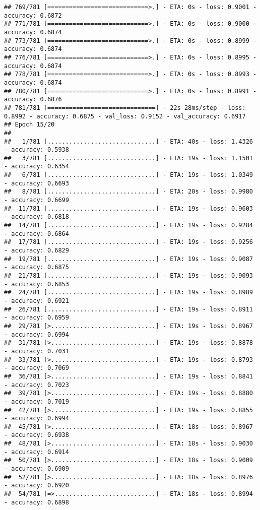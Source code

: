 \documentclass[
]{article}
\begin{document}
\begin{verbatim}
## 769/781 [============================>.] - ETA: 0s - loss: 0.9001 - accuracy: 0.6872
## 771/781 [============================>.] - ETA: 0s - loss: 0.9000 - accuracy: 0.6874
## 773/781 [============================>.] - ETA: 0s - loss: 0.8999 - accuracy: 0.6874
## 776/781 [============================>.] - ETA: 0s - loss: 0.8995 - accuracy: 0.6874
## 778/781 [============================>.] - ETA: 0s - loss: 0.8993 - accuracy: 0.6874
## 780/781 [============================>.] - ETA: 0s - loss: 0.8991 - accuracy: 0.6876
## 781/781 [==============================] - 22s 28ms/step - loss: 0.8992 - accuracy: 0.6875 - val_loss: 0.9152 - val_accuracy: 0.6917
## Epoch 15/20
## 
##   1/781 [..............................] - ETA: 40s - loss: 1.4326 - accuracy: 0.5938
##   3/781 [..............................] - ETA: 19s - loss: 1.1501 - accuracy: 0.6354
##   6/781 [..............................] - ETA: 19s - loss: 1.0349 - accuracy: 0.6693
##   8/781 [..............................] - ETA: 20s - loss: 0.9980 - accuracy: 0.6699
##  11/781 [..............................] - ETA: 19s - loss: 0.9603 - accuracy: 0.6818
##  14/781 [..............................] - ETA: 19s - loss: 0.9284 - accuracy: 0.6864
##  17/781 [..............................] - ETA: 19s - loss: 0.9256 - accuracy: 0.6829
##  19/781 [..............................] - ETA: 19s - loss: 0.9087 - accuracy: 0.6875
##  21/781 [..............................] - ETA: 19s - loss: 0.9093 - accuracy: 0.6853
##  24/781 [..............................] - ETA: 19s - loss: 0.8989 - accuracy: 0.6921
##  26/781 [..............................] - ETA: 19s - loss: 0.8911 - accuracy: 0.6959
##  29/781 [>.............................] - ETA: 19s - loss: 0.8967 - accuracy: 0.6994
##  31/781 [>.............................] - ETA: 19s - loss: 0.8878 - accuracy: 0.7031
##  33/781 [>.............................] - ETA: 19s - loss: 0.8793 - accuracy: 0.7069
##  36/781 [>.............................] - ETA: 19s - loss: 0.8841 - accuracy: 0.7023
##  39/781 [>.............................] - ETA: 19s - loss: 0.8880 - accuracy: 0.7019
##  42/781 [>.............................] - ETA: 19s - loss: 0.8855 - accuracy: 0.6994
##  45/781 [>.............................] - ETA: 18s - loss: 0.8967 - accuracy: 0.6938
##  48/781 [>.............................] - ETA: 18s - loss: 0.9030 - accuracy: 0.6914
##  50/781 [>.............................] - ETA: 18s - loss: 0.9009 - accuracy: 0.6909
##  52/781 [>.............................] - ETA: 18s - loss: 0.8976 - accuracy: 0.6920
##  54/781 [=>............................] - ETA: 18s - loss: 0.8994 - accuracy: 0.6898

\end{verbatim}
\end{document}
